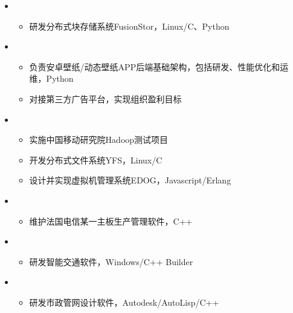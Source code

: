 \begin{itemize}[leftmargin=*]
    \item 
        {\small
        \begin{itemize}
            \item 研发分布式块存储系统FusionStor，Linux/C、Python
        \end{itemize}
        }
    \item
        {\small
        \begin{itemize}
            \item 负责安卓壁纸/动态壁纸APP后端基础架构，包括研发、性能优化和运维，Python
            \item 对接第三方广告平台，实现组织盈利目标
        \end{itemize}
        }
    \item
        {\small
        \begin{itemize}
            \item 实施中国移动研究院Hadoop测试项目
            \item 开发分布式文件系统YFS，Linux/C
            \item 设计并实现虚拟机管理系统EDOG，Javascript/Erlang
        \end{itemize}
        }
    \item 
        {\small
        \begin{itemize}
            \item 维护法国电信某一主板生产管理软件，C++
        \end{itemize}
        }
    \item 
        {\small
        \begin{itemize}
            \item 研发智能交通软件，Windows/C++ Builder
        \end{itemize}
        }
    \item 
        {\small
        \begin{itemize}
            \item 研发市政管网设计软件，Autodesk/AutoLisp/C++
        \end{itemize}
        }
\end{itemize}
